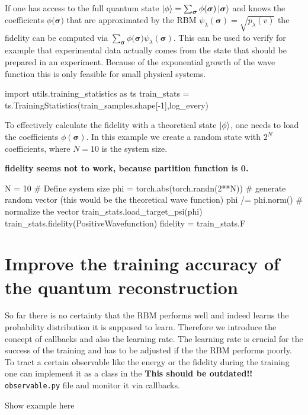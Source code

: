 \documentclass[submission, Phys]{SciPost}
\begin{document}
If one has access to the full quantum state $\ket{\phi} = \sum_{\bm{\sigma}} \phi(\bm{\sigma}) \ket{ \bm{\sigma}}$ and knows the coefficients $\phi(\bm{\sigma)}$ that are approximated by the RBM $\psi_{\lambda}(\bm{\sigma}) = \sqrt{p_{\lambda}(v)}$ the fidelity can be computed via $\sum_{\bm{\sigma}} \phi(\bm{\sigma)} \psi_{\lambda}(\bm{\sigma})$. This can be used to verify for example that experimental data actually comes from the state that should be prepared in an experiment. Because of the exponential growth of the wave function this is only feasible for small physical systems.

\begin{python}
import utils.training_statistics as ts
train_stats = ts.TrainingStatistics(train_samples.shape[-1],log_every)
\end{python}

To effectively calculate the fidelity with a theoretical state $\ket{\phi}$, one needs to load the coefficients $\phi(\bm{\sigma})$. In this example we create a random state with $2^N$ coefficients, where $N=10$ is the system size.

\textbf{fidelity seems not to work, because partition function is 0.}

\begin{python}
N = 10 # Define system size
phi =  torch.abs(torch.randn(2**N)) # generate random vector (this would be the theoretical wave function)
phi /= phi.norm() # normalize the vector
train_stats.load_target_psi(phi)
train_stats.fidelity(PositiveWavefunction)
fidelity = train_stats.F
\end{python}

\section{Improve the training accuracy of the quantum reconstruction}

So far there is no certainty that the RBM performs well and indeed learns the probability distribution it is supposed to learn. Therefore we introduce the concept of callbacks and also the learning rate. The learning rate is crucial for the success of the training and has to be adjusted if the the RBM performs poorly.
To tract a certain observable like the energy or the fidelity during the training one can implement it as a class in the \textbf{This should be outdated!!} \verb|observable.py| file and monitor it via callbacks.

\begin{python}
Show example here
\end{python}
\end{document}
